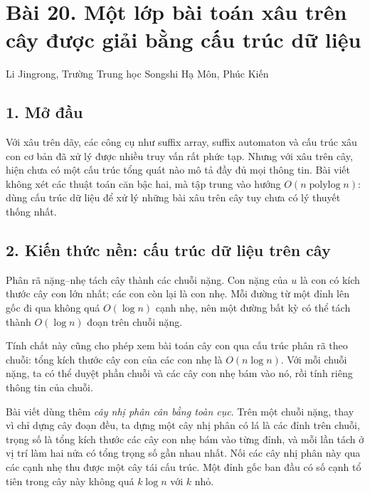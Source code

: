 \documentclass[11pt]{article}
\begin{document}
\section*{Bài 20. Một lớp bài toán xâu trên cây được giải bằng cấu trúc dữ liệu}

\begin{center}
Li Jingrong, Trường Trung học Songshi Hạ Môn, Phúc Kiến
\end{center}

\subsection*{1. Mở đầu}

Với xâu trên dãy, các công cụ như suffix array, suffix automaton và cấu trúc
xâu con cơ bản đã xử lý được nhiều truy vấn rất phức tạp. Nhưng với xâu trên
cây, hiện chưa có một cấu trúc tổng quát nào mô tả đầy đủ mọi thông tin. Bài
viết không xét các thuật toán căn bậc hai, mà tập trung vào hướng
\(O(n\operatorname{polylog} n)\): dùng cấu trúc dữ liệu để xử lý những bài xâu
trên cây tuy chưa có lý thuyết thống nhất.

\subsection*{2. Kiến thức nền: cấu trúc dữ liệu trên cây}

Phân rã nặng--nhẹ tách cây thành các chuỗi nặng. Con nặng của \(u\) là con có
kích thước cây con lớn nhất; các con còn lại là con nhẹ. Mỗi đường từ một đỉnh
lên gốc đi qua không quá \(O(\log n)\) cạnh nhẹ, nên một đường bất kỳ có thể
tách thành \(O(\log n)\) đoạn trên chuỗi nặng.

Tính chất này cũng cho phép xem bài toán cây con qua cấu trúc phân rã theo
chuỗi: tổng kích thước cây con của các con nhẹ là \(O(n\log n)\). Với mỗi
chuỗi nặng, ta có thể duyệt phần chuỗi và các cây con nhẹ bám vào nó, rồi tính
riêng thông tin của chuỗi.

Bài viết dùng thêm \emph{cây nhị phân cân bằng toàn cục}. Trên một chuỗi nặng,
thay vì chỉ dựng cây đoạn đều, ta dựng một cây nhị phân có lá là các đỉnh trên
chuỗi, trọng số là tổng kích thước các cây con nhẹ bám vào từng đỉnh, và mỗi
lần tách ở vị trí làm hai nửa có tổng trọng số gần nhau nhất. Nối các cây nhị
phân này qua các cạnh nhẹ thu được một cây tái cấu trúc. Một đỉnh gốc ban đầu
có số cạnh tổ tiên trong cây này không quá \(k\log n\) với \(k\) nhỏ.
\end{document}
